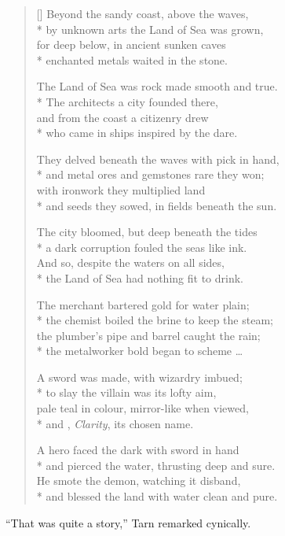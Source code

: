 \settowidth{\versewidth}{Beyond the Western coast, above the waves,}
\begin{verse}[\versewidth]
Beyond the sandy coast, above the waves,\\*
by unknown arts the Land of Sea was grown,\\
for deep below, in ancient sunken caves\\*
enchanted metals waited in the stone.

The Land of Sea was rock made smooth and true.\\*
The architects a city founded there,\\
and from the coast a citizenry drew\\*
who came in ships inspired by the dare.

They delved beneath the waves with pick in hand,\\*
and metal ores and gemstones rare they won;\\
with ironwork they multiplied land\\*
and seeds they sowed, in fields beneath the sun.

The city bloomed, but deep beneath the tides\\*
a dark corruption fouled the seas like ink.\\
And so, despite the waters on all sides,\\*
the Land of Sea had nothing fit to drink.

The merchant bartered gold for water plain;\\*
the chemist boiled the brine to keep the steam;\\
the plumber's pipe and barrel caught the rain;\\*
the metalworker bold began to scheme \ldots

A sword was made, with wizardry imbued;\\*
to slay the villain was its lofty aim,\\
pale teal in colour, mirror-like when viewed,\\*
and \kildir, \emph{Clarity}, its chosen name.

A hero faced the dark with sword in hand\\*
and pierced the water, thrusting deep and sure.\\
He smote the demon, watching it disband,\\*
and blessed the land with water clean and pure.
\end{verse}

``That was quite a story,'' Tarn remarked cynically.


